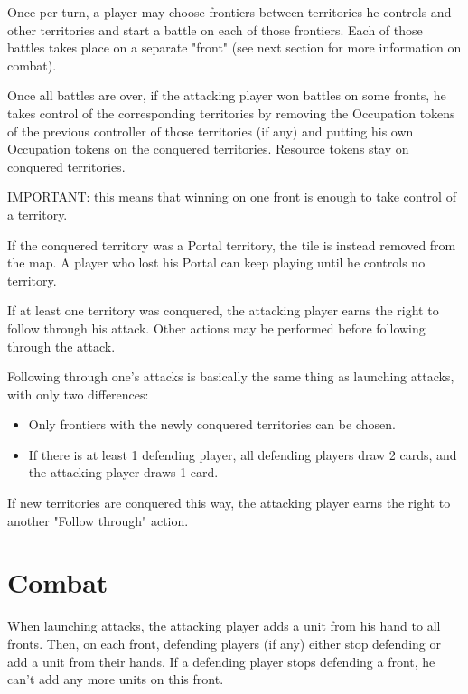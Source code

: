 \documentclass[a4paper]{article}
\begin{document}
    Once per turn, a player may choose frontiers between territories he controls and other territories and
    start a battle on each of those frontiers.
    Each of those battles takes place on a separate "front" (see next section for more information on combat).

    Once all battles are over, if the attacking player won battles on some fronts, he takes control of
    the corresponding territories by removing the Occupation tokens of the previous controller of those territories (if any)
    and putting his own Occupation tokens on the conquered territories.
    Resource tokens stay on conquered territories.
    
    IMPORTANT: this means that winning on one front is enough to take control of a territory.

    If the conquered territory was a Portal territory, the tile is instead removed from the map.
    A player who lost his Portal can keep playing until he controls no territory.

    If at least one territory was conquered, the attacking player earns the right to follow through his attack.
    Other actions may be performed before following through the attack.

    Following through one's attacks is basically the same thing as launching attacks, with only two differences:

    \begin{itemize}
        \item Only frontiers with the newly conquered territories can be chosen.
        \item If there is at least 1 defending player, all defending players draw 2 cards, and the attacking player draws 1 card.
    \end{itemize}

    If new territories are conquered this way, the attacking player earns the right to another "Follow through" action.


\newpage
\section{Combat}

    When launching attacks, the attacking player adds a unit from his hand to all fronts.
    Then, on each front, defending players (if any) either stop defending or add a unit from their hands.
    If a defending player stops defending a front, he can't add any more units on this front.
    
\end{document}
